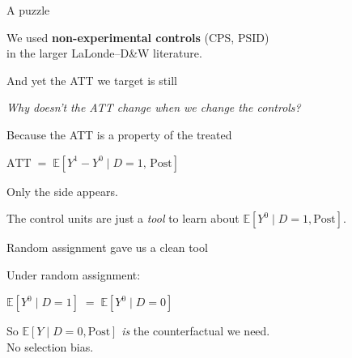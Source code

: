 \documentclass[11pt,aspectratio=169]{beamer}
\begin{document}

\begin{frame}{A puzzle}
\vspace{1em}
\begin{center}
\large
We used \textbf{non-experimental controls} (CPS, PSID) \\[0.2em] in the larger LaLonde--D\&W literature.
\end{center}
\vspace{0.6em}
\begin{center}
\large
And yet the ATT we target is still \;
\end{center}
\vspace{0.8em}
\begin{center}
\large\itshape\color{charcoal}
Why doesn't the ATT change when we change the controls?
\end{center}
\end{frame}

\begin{frame}{Because the ATT is a property of the treated}
\vspace{1.4em}
\begin{center}
\Large
$\text{ATT} \;=\; \mathbb{E}[Y^1 - Y^0 \mid D = 1,\, \text{Post}]$
\end{center}
\vspace{1.2em}
\begin{center}
\large
Only the \; \;side appears.
\end{center}
\vspace{0.6em}
\begin{center}
The control units are just a \textit{tool} to learn about $\mathbb{E}[Y^0 \mid D{=}1, \text{Post}]$.
\end{center}
\end{frame}

\begin{frame}{Random assignment gave us a clean tool}
\vspace{1.4em}
\begin{center}
\large
Under random assignment:
\end{center}
\vspace{0.4em}
\begin{center}
\Large
$\mathbb{E}[Y^0 \mid D{=}1] \;=\; \mathbb{E}[Y^0 \mid D{=}0]$
\end{center}
\vspace{1em}
\begin{center}
So $\mathbb{E}[Y \mid D{=}0, \text{Post}]$ \textit{is} the counterfactual we need. \\[0.2em]
No selection bias.
\end{center}
\end{frame}
\end{document}
